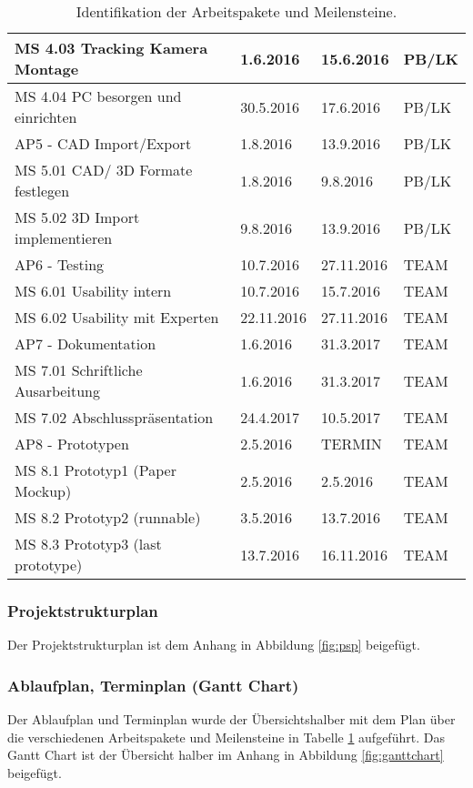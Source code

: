 \begin{table}
\begin{tabular}{|l|l|l|l|}
		\hline
		MS 4.03 Tracking Kamera Montage	& 1.6.2016 & 15.6.2016 & PB/LK\\
		\hline
		MS 4.04 PC besorgen und einrichten & 30.5.2016 & 17.6.2016 & PB/LK\\
		\hline
		AP5 - CAD Import/Export & 1.8.2016 & 13.9.2016 & PB/LK\\
		\hline
		MS 5.01 CAD/ 3D Formate festlegen & 1.8.2016 & 9.8.2016 & PB/LK\\
		\hline
		MS 5.02 3D Import implementieren & 9.8.2016 & 13.9.2016 & PB/LK\\
		\hline
		AP6 - Testing & 10.7.2016 & 27.11.2016 & TEAM\\
 		\hline
		MS 6.01 Usability intern & 10.7.2016 & 15.7.2016 & TEAM\\
 		\hline
		MS 6.02 Usability mit Experten &22.11.2016 & 27.11.2016 &TEAM\\
 		\hline
		AP7 - Dokumentation &1.6.2016 & 31.3.2017 & TEAM\\
 		\hline
		MS 7.01 Schriftliche Ausarbeitung & 1.6.2016 & 31.3.2017 & TEAM\\
 		\hline
		MS 7.02 Abschlusspräsentation & 24.4.2017 & 10.5.2017 & TEAM\\
 		\hline
		AP8 - Prototypen & 2.5.2016 & TERMIN & TEAM\\
 		\hline
		MS 8.1 Prototyp1 (Paper Mockup) & 2.5.2016 & 2.5.2016 & TEAM\\
 		\hline
		MS 8.2 Prototyp2 (runnable) & 3.5.2016 & 13.7.2016 & TEAM\\
 		\hline
		MS 8.3 Prototyp3 (last prototype) & 13.7.2016 & 16.11.2016 & TEAM\\
 		\hline
				
	\end{tabular}
	\caption[Identifikation der Arbeitspakete und Meilensteine]{Identifikation der Arbeitspakete und Meilensteine.}
	\label{tab:APMS}
\end{table}

\subsubsection{Projektstrukturplan}
Der Projektstrukturplan ist dem Anhang in Abbildung \ref{fig:psp} beigefügt.


\subsubsection{Ablaufplan, Terminplan (Gantt Chart)}
Der Ablaufplan und Terminplan wurde der Übersichtshalber mit dem Plan über die verschiedenen Arbeitspakete und Meilensteine in Tabelle \ref{tab:APMS} aufgeführt. Das Gantt Chart ist der Übersicht halber im Anhang in Abbildung \ref{fig:ganttchart} beigefügt.
